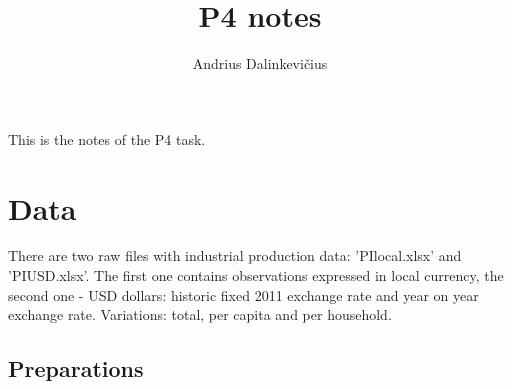 \documentclass[a4paper]{article}
\title{P4 notes}
\author{Andrius Dalinkevi\v cius}
\begin{document}
\maketitle

This is the notes of the P4 task.

\section{Data}
There are two raw files with industrial production data:
'PIlocal.xlsx' and 'PIUSD.xlsx'. The first one contains observations
expressed in local currency, the second one - USD dollars: historic
fixed 2011 exchange rate and year on year exchange rate. Variations:
total, per capita and per household.

\subsection{Preparations}
\end{document}
